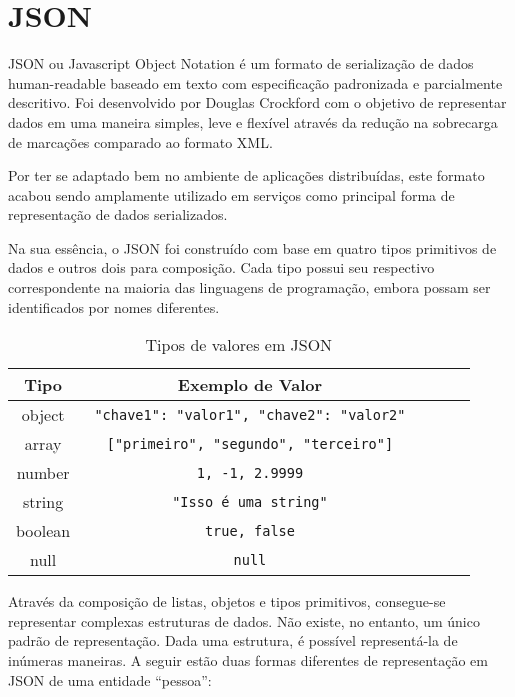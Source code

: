 \section{JSON}

JSON ou Javascript Object Notation é um formato de serialização de dados human-readable baseado em texto com especificação padronizada e parcialmente descritivo. Foi desenvolvido por Douglas Crockford com o objetivo de representar dados em uma maneira simples, leve e flexível através da redução na sobrecarga de marcações comparado ao formato XML.

Por ter se adaptado bem no ambiente de aplicações distribuídas, este formato acabou sendo amplamente utilizado em serviços como principal forma de representação de dados serializados. \cite{Duvander2013}

Na sua essência, o JSON foi construído com base em quatro tipos primitivos de dados e outros dois para composição. Cada tipo possui seu respectivo correspondente na maioria das linguagens de programação, embora possam ser identificados por nomes diferentes. \cite{Droettboom2015}

\begin{table}[H]
  \centering
  \begin{tabular}{|c|c|c|c|c|}
    \hline
    Tipo & Exemplo de Valor \\
    \hline
    object & \texttt{ {"chave1": "valor1", "chave2": "valor2"} } \\
    \hline
    array & \texttt{ ["primeiro", "segundo", "terceiro"] } \\
    \hline
    number & \texttt{ 1, -1, 2.9999 } \\
    \hline
    string & \texttt{ "Isso é uma string" } \\
    \hline
    boolean & \texttt{ true, false } \\
    \hline
    null & \texttt{ null } \\
    \hline
  \end{tabular}
  \caption{Tipos de valores em JSON}
\end{table}

Através da composição de listas, objetos e tipos primitivos, consegue-se representar complexas estruturas de dados. Não existe, no entanto, um único padrão de representação. Dada uma estrutura, é possível representá-la de inúmeras maneiras. A seguir estão duas formas diferentes de representação em JSON de uma entidade “pessoa”:
 \cite{Droettboom2015}

